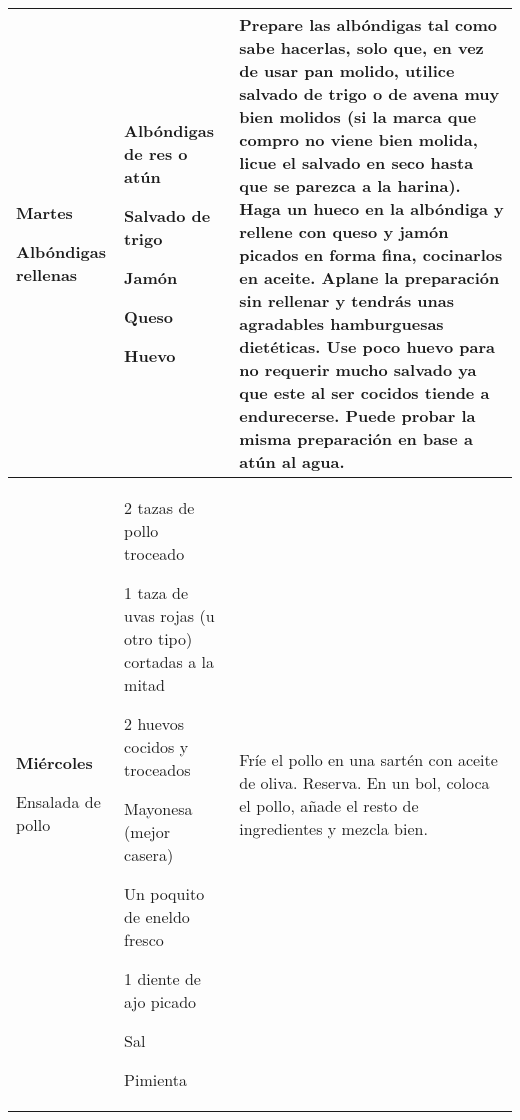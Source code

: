 \documentclass[menu.tex]{subfiles}
\begin{document}
\begin{tabular} {p{3.5cm} p{4cm} p{9cm}}
\pbox{20cm}
{
    \rule{0pt}{3ex}\begin{large}\textbf{Martes}\end{large}\\
    \rule{0pt}{2ex}Albóndigas rellenas
}&
\vspace{-0.4cm}
\begin{compactitem} 
    \begin{footnotesize}
        \item Albóndigas de res o atún
        \item Salvado de trigo
        \item Jamón
        \item Queso
        \item Huevo
    \end{footnotesize}
\end{compactitem}&
\vspace{-0.4cm}
Prepare las albóndigas tal como sabe hacerlas, solo que, en vez de usar pan molido, utilice salvado de trigo o de avena muy bien molidos (si la marca que compro no viene bien molida, licue el salvado en seco hasta que se parezca a la harina). Haga un hueco en la albóndiga y rellene con queso y jamón picados en forma fina, cocinarlos en aceite. Aplane la preparación sin rellenar y tendrás unas agradables hamburguesas dietéticas. Use poco huevo para no requerir mucho salvado ya que este al ser cocidos tiende a endurecerse. Puede probar la misma preparación en base a atún al agua.\\
\hline
    
\pbox{20cm}
{
    \rule{0pt}{3ex}\begin{large}\textbf{Miércoles}\end{large}\\ 
    \rule{0pt}{2ex}Ensalada de pollo
} & 
\vspace{-0.4cm}            
\begin{compactitem} 
    \begin{scriptsize}
        \item 2 tazas de pollo troceado
        \item 1 taza de uvas rojas (u otro tipo) cortadas a la mitad
        \item 2 huevos cocidos y troceados
        \item Mayonesa (mejor casera)
        \item Un poquito de eneldo fresco
        \item 1 diente de ajo picado
        \item Sal
        \item Pimienta
    \end{scriptsize}
\end{compactitem}&
\vspace{-0.4cm}        
Fríe el pollo en una sartén con aceite de oliva. Reserva.
En un bol, coloca el pollo, añade el resto de ingredientes y mezcla bien.


\end{tabular}
\end{document}

